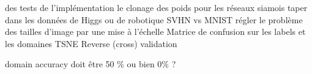 
\TODO des tests de l'implémentation
\TODO le clonage des poids pour les réseaux siamois
\TODO taper dans les données de Higgs ou de robotique
\TODO SVHN vs MNIST régler le problème des tailles d'image par une 
mise à l'échelle
\TODO Matrice de confusion sur les labels et les domaines
\TODO TSNE
\TODO Reverse (cross) validation

\TODO domain accuracy doit être 50 \% ou bien 0\% ?

